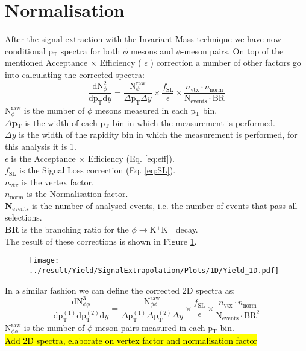 \section{Normalisation}
\label{sec:Normalisation}
After the signal extraction with the Invariant Mass technique we have now conditional p$_{\text{T}}$ spectra for both $\phi$ mesons and $\phi$-meson pairs. On top of the mentioned Acceptance $\times$ Efficiency ( $\epsilon$ ) correction a number of other factors go into calculating the corrected spectra:
\begin{equation}
\frac{\text{dN}^2_{\phi}}{\text{dp}_{\text{T}}\text{d}y} = \frac{\text{N}_{\phi}^{\text{raw}}}{\Delta\text{p}_{\text{T}}\Delta y} \times \frac{f_{\text{SL}}}{\epsilon} \times \frac{n_{\text{vtx}}\cdot n_{\text{norm}}}{\text{N}_{\text{events}}\cdot \text{BR}}
\label{eq:1Dcorr}
\end{equation}
\textbf{$\text{N}_{\phi}^{\text{raw}}$} is the number of $\phi$ mesons measured in each p$_{\text{T}}$ bin.\\
\textbf{$\Delta$p$_{\text{T}}$} is the width of each p$_{\text{T}}$ bin in which the measurement is performed.\\
\textbf{$\Delta y$} is the width of the rapidity bin in which the measurement is performed, for this analysis it is 1.\\
\textbf{$\epsilon$} is the Acceptance $\times$ Efficiency (Eq. \ref{eq:eff}).\\
\textbf{$f_{\text{SL}}$} is the Signal Loss correction (Eq. \ref{eq:SL}).\\
\textbf{$n_{\text{vtx}}$} is the vertex factor.\\
\textbf{$n_{\text{norm}}$} is the Normalisation factor.\\
\textbf{N$_{\text{events}}$} is the number of analysed events, i.e. the number of events that pass all selections.\\
\textbf{BR} is the branching ratio for the $\phi \to$K$^+$K$^-$ decay.\\
\indent The result of these corrections is shown in Figure \ref{fig:spectrum1D}.

\begin{figure}
\centering
\texttt{[image: ../result/Yield/SignalExtrapolation/Plots/1D/Yield\_1D.pdf]}
\label{fig:spectrum1D}
\caption{}
\end{figure}

\indent In a similar fashion we can define the corrected 2D spectra as:
\begin{equation}
\frac{\text{dN}^3_{\phi\phi}}{\text{dp}^{(1)}_{\text{T}}\text{dp}^{(2)}_{\text{T}}\text{d}y} = \frac{\text{N}_{\phi\phi}^{\text{raw}}}{\Delta\text{p}^{(1)}_{\text{T}}\Delta\text{p}^{(2)}_{\text{T}}\Delta y} \times \frac{f_{\text{SL}}}{\epsilon} \times \frac{n_{\text{vtx}}\cdot n_{\text{norm}}}{\text{N}_{\text{events}}\cdot \text{BR}^2}
\label{eq:2Dcorr}
\end{equation}
\textbf{$\text{N}_{\phi\phi}^{\text{raw}}$} is the number of $\phi$-meson pairs measured in each p$_{\text{T}}$ bin.\\
\hl{Add 2D spectra, elaborate on vertex factor and normalisation factor}